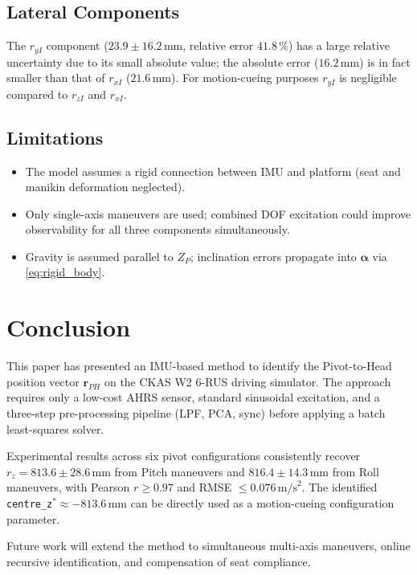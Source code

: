 \documentclass[conference]{IEEEtran}
\newcommand{\vv}[1]{\bm{#1}}          %
\newcommand{\mm}{\,\text{mm}}
\newcommand{\rPH}{\vv{r}_{PH}}
\newcommand{\alp}{\bm{\alpha}}
\begin{document}
\subsection{Lateral Components}

The $r_{yI}$ component ($23.9 \pm 16.2\mm$, relative error
$41.8\,\%$) has a large relative uncertainty due to its small
absolute value; the absolute error ($16.2\mm$) is in fact smaller than
that of $r_{xI}$ ($21.6\mm$).
For motion-cueing purposes $r_{yI}$ is negligible compared to $r_{zI}$
and $r_{xI}$.

\subsection{Limitations}

\begin{itemize}
  \item The model assumes a rigid connection between IMU and platform
        (seat and manikin deformation neglected).
  \item Only single-axis maneuvers are used; combined DOF excitation
        could improve observability for all three components
        simultaneously.
  \item Gravity is assumed parallel to $Z_P$; inclination errors
        propagate into $\alp$ via \eqref{eq:rigid_body}.
\end{itemize}

\section{Conclusion}
\label{sec:conclusion}

This paper has presented an IMU-based method to identify the
Pivot-to-Head position vector $\rPH$ on the CKAS W2 6-RUS driving
simulator.
The approach requires only a low-cost AHRS sensor, standard sinusoidal
excitation, and a three-step pre-processing pipeline (LPF, PCA, sync)
before applying a batch least-squares solver.

Experimental results across six pivot configurations consistently
recover $r_z = 813.6 \pm 28.6\mm$ from Pitch maneuvers
and $816.4 \pm 14.3\mm$ from Roll maneuvers, with Pearson
$r \ge 0.97$ and RMSE $\le 0.076\,\text{m/s}^2$.
The identified \texttt{centre\_z}$^* \approx -813.6\mm$ can be
directly used as a motion-cueing configuration parameter.

Future work will extend the method to simultaneous multi-axis
maneuvers, online recursive identification, and compensation of seat
compliance.
\end{document}
